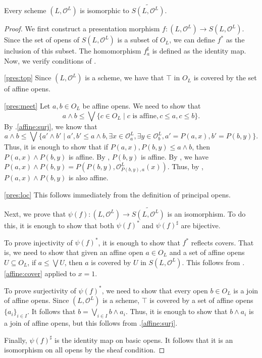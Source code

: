 \documentclass[reqno]{amsart}
\theoremstyle{definition}
\theoremstyle{remark}
\numberwithin{figure}{section}
\begin{document}
\begin{prop}
Every scheme $(L,\mathcal{O}^L)$ is isomorphic to $\widetilde{S(L,\mathcal{O}^L)}$.
\end{prop}
\begin{proof}
We first construct a presentation morphism $f : (L,\mathcal{O}^L) \to S(L,\mathcal{O}^L)$.
Since the set of opens of $S(L,\mathcal{O}^L)$ is a subset of $O_L$, we can define $f^*$ as the inclusion of this subset.
The homomorphism $f^\sharp_a$ is defined as the identity map.
Now, we verify conditions of .

\eqref{pres:top}
Since $(L,\mathcal{O}^L)$ is a scheme, we have that $\top$ in $O_L$ is covered by the set of affine opens.

\eqref{pres:meet}
Let $a,b \in O_L$ be affine opens. We need to show that
\[ a \wedge b \leq \bigvee \{ c \in O_L \mid c \text{ is affine}, c \leq a, c \leq b \}. \]
By .\eqref{affine:surj}, we know that
\[ a \wedge b \leq \bigvee \{ a' \wedge b' \mid a',b' \leq a \wedge b, \exists x \in \mathcal{O}^L_a, \exists y \in \mathcal{O}^L_b, a' = P(a,x), b' = P(b,y) \}. \]
Thus, it is enough to show that if $P(a,x),P(b,y) \leq a \wedge b$, then $P(a,x) \wedge P(b,y)$ is affine.
By , $P(b,y)$ is affine.
By , we have $P(a,x) \wedge P(b,y) = P(P(b,y),\mathcal{O}^L_{P(b,y),a}(x))$.
Thus, by , $P(a,x) \wedge P(b,y)$ is also affine.

\eqref{pres:loc}
This follows immediately from the definition of principal opens.

Next, we prove that $\psi(f) : (L,\mathcal{O}^L) \to \widetilde{S(L,\mathcal{O}^L)}$ is an isomorphism.
To do this, it is enough to show that both $\psi(f)^*$ and $\psi(f)^\sharp$ are bijective.

To prove injectivity of $\psi(f)^*$, it is enough to show that $f^*$ reflects covers.
That is, we need to show that given an affine open $a \in O_L$ and a set of affine opens $U \subseteq O_L$, if $a \leq \bigvee U$, then $a$ is covered by $U$ in $S(L,\mathcal{O}^L)$.
This follows from .\eqref{affine:cover} applied to $x = 1$.

To prove surjectivity of $\psi(f)^*$, we need to show that every open $b \in O_L$ is a join of affine opens.
Since $(L,\mathcal{O}^L)$ is a scheme, $\top$ is covered by a set of affine opens $\{ a_i \}_{i \in I}$.
It follows that $b = \bigvee_{i \in I} b \wedge a_i$.
Thus, it is enough to show that $b \wedge a_i$ is a join of affine opens, but this follows from .\eqref{affine:surj}. 

Finally, $\psi(f)^\sharp$ is the identity map on basic opens.
It follows that it is an isomorphism on all opens by the sheaf condition.
\end{proof}
\end{document}
